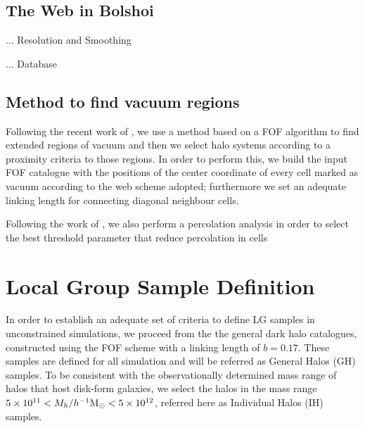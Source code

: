 \documentclass[usenatbib]{latex/mn2e}
\begin{document}
\subsection{The Web in Bolshoi}
\label{subsec:web_in_simulations}
... Resolution and Smoothing

... Database


\subsection{Method to find vacuum regions}
\label{subsec:method_vacuum}



Following the recent work of , we use a method 
based on a FOF algorithm to find extended regions of vacuum and then we 
select halo systems according to a proximity criteria to those regions. 
In order to perform this, we build the input FOF catalogue with the 
positions of the center coordinate of every cell marked as vacuum according 
to the web scheme adopted; furthermore we set an adequate linking length 
for connecting diagonal neighbour cells.



Following the work of , we also perform a 
percolation analysis in order to select the best threshold parameter that
reduce percolation in cells



\section{Local Group Sample Definition}
\label{section:Def_Samples}



In order to establish an adequate set of criteria to define LG samples in 
unconstrained simulations, we proceed from the the general dark halo 
catalogues, constructed using the FOF scheme with a linking length of 
$b=0.17$. These samples are defined for all simulation and will be 
referred as General Halos (GH) samples. To be consistent with the 
observationally determined mass range of halos that host disk-form 
galaxies, we select the halos in the mass range $5\times10^{11} <
M_{h}/\hMsun < 5\times 10^{12}$, referred here as Individual Halos (IH) 
samples. 
\end{document}
